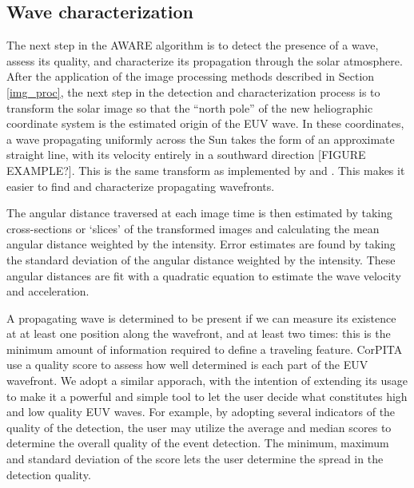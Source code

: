 \subsection{Wave characterization}
\label{wave_char}

The next step in the AWARE algorithm is to detect the presence of a wave, assess its
quality, and characterize its propagation through the solar
atmosphere. After the application of the image processing methods described in Section \ref{img_proc}, the next step in the detection and characterization process is to transform the solar image so that the  “north pole” of the new heliographic coordinate system is the estimated origin of the EUV wave. In these coordinates, a wave propagating uniformly across the Sun takes the form of an approximate straight line, with its velocity entirely in a southward direction [FIGURE EXAMPLE?].  This is the same transform as implemented by \citet{2014SoPh..289.3279L} and \citet{2005SoPh..228..265P}. This makes it easier to find and characterize propagating wavefronts.

The angular distance traversed at each image time is then estimated by taking cross-sections or `slices' of the transformed images and calculating the mean angular distance weighted by the intensity.  Error estimates are found by taking the standard deviation of the angular distance weighted by the intensity. These angular distances are fit with a quadratic equation to estimate the wave velocity and acceleration.

A propagating wave is determined to be present if we can measure its existence at at least one position along the wavefront, and at least two times: this is the minimum amount of information required to define a traveling feature.  CorPITA \citep{2014SoPh..289.3279L} use a quality score to assess how well determined is each part of the EUV wavefront. We adopt a similar apporach, with the intention of extending its usage to make it a powerful and simple tool to let the user decide what constitutes high and low quality EUV waves. For example, by adopting several indicators of the quality of the detection, the user may utilize the average and median scores to determine the overall quality of the event detection.  The minimum, maximum and standard deviation of the score lets the user determine the spread in the detection quality.  
